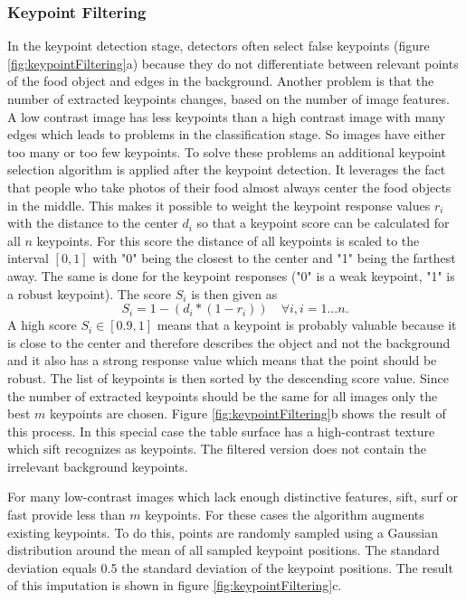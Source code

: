 \subsubsection*{Keypoint Filtering}
\label{subsub:keypointFiltering}
In the keypoint detection stage, detectors often select false keypoints {(figure \ref{fig:keypointFiltering}a)} because they do not differentiate between relevant points of the food object and edges in the background. Another problem is that the number of extracted keypoints changes, based on the number of image features. A low contrast image has less keypoints than a high contrast image with many edges which leads to problems in the classification stage. So images have either too many or too few keypoints. To solve these problems an additional keypoint selection algorithm is applied after the keypoint detection. It leverages the fact that people who take photos of their food almost always center the food objects in the middle. This makes it possible to weight the keypoint response values $r_i$ with the distance to the center $d_i$ so that a keypoint score can be calculated for all $n$ keypoints. For this score the distance of all keypoints is scaled to the interval $[0, 1]$ with "0" being the closest to the center and "1" being the farthest away. The same is done for the keypoint responses {("0" is a weak keypoint, "1" is a robust keypoint)}. The score $S_i$ is then given as
\begin{equation}
	S_i = 1- (d_i * (1 - r_i)) \quad \forall i, i=1 \dots n
	.
\end{equation}
A high score $S_i \in [0.9, 1]$ means that a keypoint is probably valuable because it is close to the center and therefore describes the object and not the background and it also has a strong response value which means that the point should be robust. The list of keypoints is then sorted by the descending score value. Since the number of extracted keypoints should be the same for all images only the best $m$ keypoints are chosen. Figure \ref{fig:keypointFiltering}b shows the result of this process. In this special case the table surface has a high-contrast texture which \gls{sift} recognizes as keypoints. The filtered version does not contain the irrelevant background keypoints.

For many low-contrast images which lack enough distinctive features, \gls{sift}, \gls{surf} or \gls{fast} provide less than $m$ keypoints. For these cases the algorithm augments existing keypoints. To do this, points are randomly sampled using a Gaussian distribution around the mean of all sampled keypoint positions. The standard deviation equals 0.5 the standard deviation of the keypoint positions. The result of this imputation is shown in figure \ref{fig:keypointFiltering}c.

